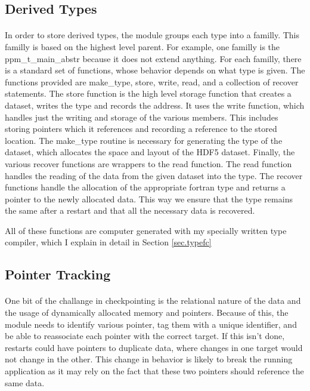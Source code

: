 \documentclass{article}
\begin{document}
\subsection{Derived Types}
\paragraph{}
In order to store derived types, the module groups each type into a familly. This familly is based on the highest level parent. For example, one familly is the ppm\_t\_main\_abstr because it does not extend anything. For each familly, there is a standard set of functions, whose behavior depends on what type is given. The functions provided are make\_type, store, write, read, and a collection of recover statements. The store function is the high level storage function that creates a dataset, writes the type and records the address. It uses the write function, which handles just the writing and storage of the various members. This includes storing pointers which it references and recording a reference to the stored location. The make\_type routine is necessary for generating the type of the dataset, which allocates the space and layout of the HDF5 dataset. Finally, the various recover functions are wrappers to the read function. The read function handles the reading of the data from the given dataset into the type. The recover functions handle the allocation of the appropriate fortran type and returns a pointer to the newly allocated data. This way we ensure that the type remains the same after a restart and that all the necessary data is recovered.

All of these functions are computer generated with my specially written type compiler, which I explain in detail in Section \ref{sec.typefc}
\subsection{Pointer Tracking}
\paragraph{}
One bit of the challange in checkpointing is the relational nature of the data and the usage of dynamically allocated memory and pointers. Because of this, the module needs to identify various pointer, tag them with a unique identifier, and be able to reassociate each pointer with the correct target. If this isn't done, restarts could have pointers to duplicate data, where changes in one target would not change in the other. This change in behavior is likely to break the running application as it may rely on the fact that these two pointers should reference the same data.
\end{document}
